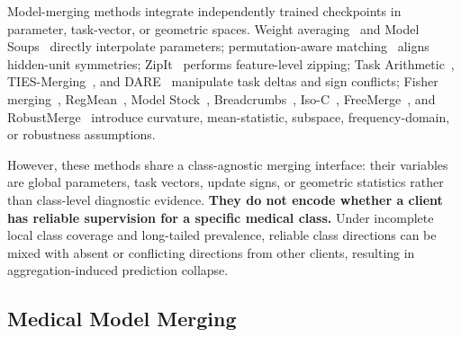 \documentclass[letterpaper]{article} %
\begin{document}
Model-merging methods integrate independently trained checkpoints in parameter, task-vector, or geometric spaces. Weight averaging~\cite{izmailov2018averaging} and Model Soups~\cite{pmlr-v162-wortsman22a} directly interpolate parameters; permutation-aware matching~\cite{entezari2022role,ainsworth2023gitrebasinmergingmodels} aligns hidden-unit symmetries; ZipIt~\cite{stoica2024zipit} performs feature-level zipping; Task Arithmetic~\cite{ilharco2023editingmodelstaskarithmetic}, TIES-Merging~\cite{yadav2023tiesmergingresolvinginterferencemerging}, and DARE~\cite{yu2024languagemodelssupermario} manipulate task deltas and sign conflicts; Fisher merging~\cite{matena2022mergingmodelsfisherweightedaveraging}, RegMean~\cite{jin2025datalessknowledgefusionmerging}, Model Stock~\cite{jang2025modelstockneedjust}, Breadcrumbs~\cite{davari2024modelbreadcrumbsscalingmultitask}, Iso-C~\cite{marczak2025taskleftbehindisotropic}, FreeMerge~\cite{zheng2025freemergingfouriertransformefficient}, and RobustMerge~\cite{zeng2025robustmergeparameterefficientmodelmerging} introduce curvature, mean-statistic, subspace, frequency-domain, or robustness assumptions.

However, these methods share a class-agnostic merging interface: their variables are global parameters, task vectors, update signs, or geometric statistics rather than class-level diagnostic evidence. \textbf{They do not encode whether a client has reliable supervision for a specific medical class.} Under incomplete local class coverage and long-tailed prevalence, reliable class directions can be mixed with absent or conflicting directions from other clients, resulting in aggregation-induced prediction collapse\cite{BUDA2018249,10.1371/journal.pmed.1002683}.

\subsection{Medical Model Merging}
\end{document}
